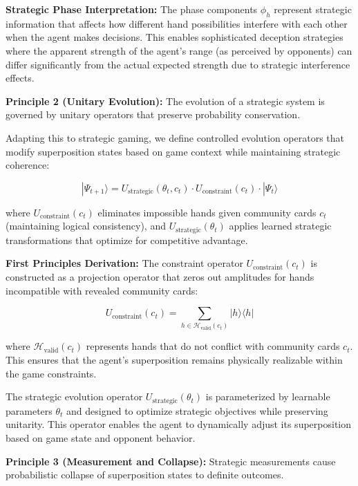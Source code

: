 \documentclass[11pt,a4paper]{article}
\begin{document}
\textbf{Strategic Phase Interpretation:} The phase components $\phi_h$ represent strategic information that affects how different hand possibilities interfere with each other when the agent makes decisions. This enables sophisticated deception strategies where the apparent strength of the agent's range (as perceived by opponents) can differ significantly from the actual expected strength due to strategic interference effects.

\textbf{Principle 2 (Unitary Evolution):} The evolution of a strategic system is governed by unitary operators that preserve probability conservation.

Adapting this to strategic gaming, we define controlled evolution operators that modify superposition states based on game context while maintaining strategic coherence:

\begin{equation}
|\Psi_{t+1}\rangle = U_{\text{strategic}}(\theta_t, c_t) \cdot U_{\text{constraint}}(c_t) \cdot |\Psi_t\rangle
\end{equation}

where $U_{\text{constraint}}(c_t)$ eliminates impossible hands given community cards $c_t$ (maintaining logical consistency), and $U_{\text{strategic}}(\theta_t)$ applies learned strategic transformations that optimize for competitive advantage.

\textbf{First Principles Derivation:} The constraint operator $U_{\text{constraint}}(c_t)$ is constructed as a projection operator that zeros out amplitudes for hands incompatible with revealed community cards:

\begin{equation}
U_{\text{constraint}}(c_t) = \sum_{h \in \mathcal{H}_{\text{valid}}(c_t)} |h\rangle\langle h|
\end{equation}

where $\mathcal{H}_{\text{valid}}(c_t)$ represents hands that do not conflict with community cards $c_t$. This ensures that the agent's superposition remains physically realizable within the game constraints.

The strategic evolution operator $U_{\text{strategic}}(\theta_t)$ is parameterized by learnable parameters $\theta_t$ and designed to optimize strategic objectives while preserving unitarity. This operator enables the agent to dynamically adjust its superposition based on game state and opponent behavior.

\textbf{Principle 3 (Measurement and Collapse):} Strategic measurements cause probabilistic collapse of superposition states to definite outcomes.
\end{document}
